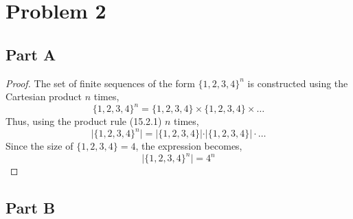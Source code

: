 \documentclass{article}
\begin{document}
\break

\section*{Problem 2}

\subsection*{Part A}

\begin{proof}

  The set of finite sequences of the form $\{1, 2, 3, 4\}^n$ is constructed
  using the Cartesian product $n$ times,
  $$ \{1, 2, 3, 4\}^n = \{1, 2, 3, 4\} \times \{1, 2, 3, 4\} \times \ldots $$
  Thus, using the product rule (15.2.1) $n$ times,
  $$ \vert \{1, 2, 3, 4\}^n \vert = \vert \{1, 2, 3, 4\} \vert \cdot \vert \{1,
  2, 3, 4\} \vert \cdot \ldots $$
  Since the size of $\{1, 2, 3, 4\} = 4$, the expression becomes,
  $$ \vert \{1, 2, 3, 4\}^n \vert = 4^n $$

\end{proof}

\break

\subsection*{Part B}
\end{document}
